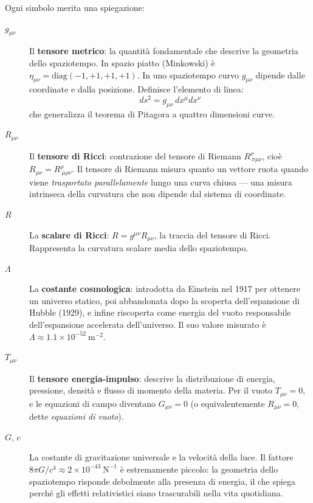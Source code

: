 \documentclass[12pt, a4paper, twoside]{article}
\theoremstyle{definition}
\newcommand{\munu}{{\mu\nu}}
\newcommand{\mink}{\eta_{\munu}}
\newcommand{\Gmunu}{G_{\munu}}
\newcommand{\Rmunu}{R_{\munu}}
\newcommand{\Tmunu}{T_{\munu}}
\newcommand{\gmunu}{g_{\munu}}
\begin{document}
\medskip
Ogni simbolo merita una spiegazione:

\begin{description}
  \item[$\gmunu$] Il \textbf{tensore metrico}: la quantità fondamentale che
    descrive la geometria dello spaziotempo. In spazio piatto (Minkowski) è
    $\mink = \text{diag}(-1,+1,+1,+1)$. In uno spaziotempo curvo $\gmunu$
    dipende dalle coordinate e dalla posizione. Definisce l'elemento di linea:
    \[
      ds^2 = \gmunu\, dx^\mu dx^\nu
    \]
    che generalizza il teorema di Pitagora a quattro dimensioni curve.

  \item[$\Rmunu$] Il \textbf{tensore di Ricci}: contrazione del tensore di
    Riemann $R^\rho_{\ \sigma\mu\nu}$, cioè $\Rmunu = R^\rho_{\ \mu\rho\nu}$.
    Il tensore di Riemann misura quanto un vettore ruota quando viene
    \emph{trasportato parallelamente} lungo una curva chiusa — una misura
    intrinseca della curvatura che non dipende dal sistema di coordinate.

  \item[$R$] La \textbf{scalare di Ricci}: $R = g^{\munu}\Rmunu$, la traccia
    del tensore di Ricci. Rappresenta la curvatura scalare media dello
    spaziotempo.

  \item[$\Lambda$] La \textbf{costante cosmologica}: introdotta da Einstein
    nel 1917 per ottenere un universo statico, poi abbandonata dopo la scoperta
    dell'espansione di Hubble (1929), e infine riscoperta come energia del vuoto
    responsabile dell'espansione accelerata dell'universo. Il suo valore
    misurato è $\Lambda \approx 1.1 \times 10^{-52}\ \text{m}^{-2}$.

  \item[$\Tmunu$] Il \textbf{tensore energia-impulso}: descrive la distribuzione
    di energia, pressione, densità e flusso di momento della materia. Per il
    vuoto $\Tmunu = 0$, e le equazioni di campo diventano $\Gmunu = 0$ (o
    equivalentemente $\Rmunu = 0$, dette \emph{equazioni di vuoto}).

  \item[$G$, $c$] La costante di gravitazione universale e la velocità della
    luce. Il fattore $8\pi G/c^4 \approx 2 \times 10^{-43}\ \text{N}^{-1}$
    è estremamente piccolo: la geometria dello spaziotempo risponde debolmente
    alla presenza di energia, il che spiega perché gli effetti relativistici
    siano trascurabili nella vita quotidiana.
\end{description}
\end{document}

